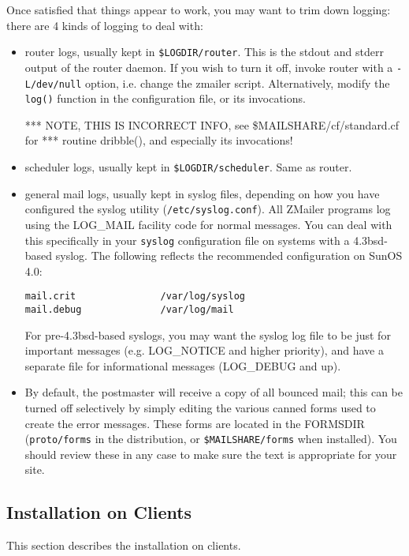 Once satisfied that things appear to work, you may want to trim down
logging: there are 4 kinds of logging to deal with:
\begin{itemize}
\item router logs, usually kept in {\tt \$LOGDIR/router}.  This is the stdout
and stderr output of the router daemon.  If you wish to turn it off,
invoke router with a {\tt -L/dev/null} option, i.e. change the zmailer
script.  Alternatively, modify the {\tt log()} function in the
configuration file, or its invocations.

*** NOTE, THIS IS INCORRECT INFO, see  \$MAILSHARE/cf/standard.cf for
*** routine   dribble(),  and especially its invocations!
\item scheduler logs, usually kept in {\tt \$LOGDIR/scheduler}.  Same as router.
\item general mail logs, usually kept in syslog files, depending on how
you have configured the syslog utility ({\tt /etc/syslog.conf}).  All
ZMailer programs log using the LOG\_MAIL facility code for normal
messages.  You can deal with this specifically in your {\tt syslog}
configuration file on systems with a 4.3bsd-based syslog.  The
following reflects the recommended configuration on SunOS 4.0:
\begin{verbatim}
mail.crit               /var/log/syslog
mail.debug              /var/log/mail
\end{verbatim}

For pre-4.3bsd-based syslogs, you may want the syslog log file
to be just for important messages (e.g. LOG\_NOTICE and higher
priority), and have a separate file for informational messages
(LOG\_DEBUG and up).
\item By default, the postmaster will receive a copy of all bounced
mail; this can be turned off selectively by simply editing the
various canned forms used to create the error messages.  These
forms are located in the FORMSDIR ({\tt proto/forms} in the distribution,
or {\tt \$MAILSHARE/forms} when installed).  You should review these
in any case to make sure the text is appropriate for your site.
\end{itemize}





\subsection{Installation on Clients}

This section describes the installation on clients.


